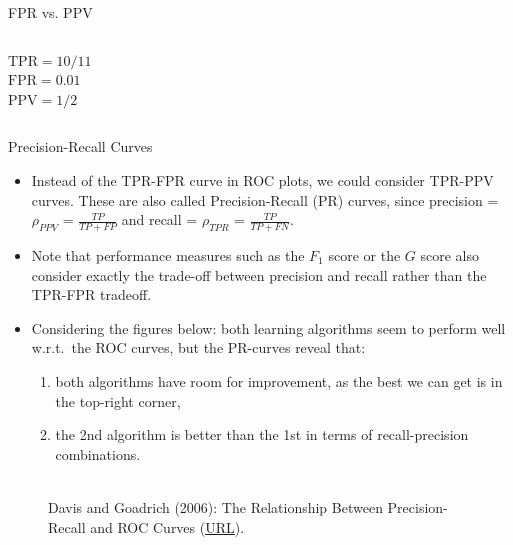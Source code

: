 \begin{frame}{FPR vs. PPV}
\begin{columns}
\begin{column}{0.45\textwidth}
				\medskip
				$\text{TPR} = 10/11$\\
				$\text{FPR} = 0.01$\\
				$\text{PPV} = 1/2$
			\end{column}
		\end{columns}
		
		
		
		
		
	\end{frame}
	
	\begin{frame}{Precision-Recall Curves}
		
		\footnotesize{
			\begin{itemize}
%				
				\item Instead of the TPR-FPR curve in ROC plots, we could consider TPR-PPV curves. These are also called Precision-Recall (PR) curves, since precision = $\rho_{PPV}$ = $\frac{TP}{TP + FP}$ and recall = $\rho_{TPR}$ = $\frac{TP}{TP + FN}.$
%
				\item Note that performance measures such as the $F_1$ score or the $G$ score also consider exactly the trade-off between precision and recall rather than the TPR-FPR tradeoff. 
%				
				\item Considering the figures below: both learning algorithms seem to perform well w.r.t.\ the ROC curves, but the PR-curves reveal that: 
%				
				\begin{enumerate}
%					
					\footnotesize
					\item both algorithms have room for improvement, as the best we can get is in the top-right corner,
%					
					\item the 2nd algorithm is better than the 1st in terms of recall-precision combinations.
%					
				\end{enumerate}
%				
%				
			\end{itemize}
		\vfill
		
		\begin{figure}
			\centering
			\tiny
			\\Davis and Goadrich (2006): The Relationship Between Precision-Recall and
			ROC Curves (\href{https://www.biostat.wisc.edu/~page/rocpr.pdf}
			{\underline{URL}}).
		\end{figure}
		
}
\end{frame}
